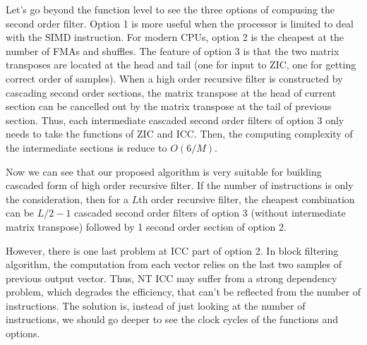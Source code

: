 
Let's go beyond the function level to see the three options of compusing the second order filter. Option 1 is more useful when the processor is limited to deal with the SIMD instruction.
For modern CPUs, option 2 is the cheapest at the number of FMAs and shuffles. The feature of option 3 is that the two matrix transposes
are located at the head and tail (one for input to ZIC, one for getting correct order of samples). When a high order recursive filter is constructed by cascading second order sections,
the matrix transpose at the head of current section 
can be cancelled out by the matrix transpose at the tail of previous section. 
Thus, each intermediate cascaded second order filters of option 3 only needs to take the functions of ZIC and ICC.
Then, the computing complexity of the intermediate sections is reduce to $O(6/M)$.



Now we can see that our proposed algorithm is very suitable for building cascaded form of high order recursive filter.
If the number of instructions is only the consideration, then for a $L$th order recursive filter,
the cheapest combination can be $L/2-1$ cascaded second order filters of option 3 (without intermediate matrix transpose)
followed by 1 second order section of option 2.

However, there is one last problem at ICC part of option 2. In block filtering algorithm, the computation from each vector
relies on the last two samples of previous output vector. Thus, 
NT ICC may suffer from a strong dependency problem, which degrades the efficiency,
that can't be reflected from the number of instructions.
The solution is, instead of just looking at the number of instructions,  
we should go deeper to see the clock cycles of the functions and options.






